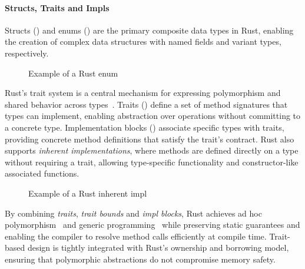 \paragraph{Structs, Traits and Impls}
Structs () and enums () are the primary composite data types in Rust, enabling the creation of complex data structures with named fields and variant types, respectively.
\begin{figure}[htb!]
	\centering
	\begin{minipage}{0.49\textwidth}
		\centering
		\captionsetup{type=listing,skip=2pt}
		\caption{Example of a Rust struct}
	\end{minipage}
	\hfill
	\begin{minipage}{0.49\textwidth}
		\centering
		\captionsetup{type=listing,skip=2pt}
		\caption{Example of a Rust enum}
	\end{minipage}
	\label{fig:structs-enums}
\end{figure}

Rust's trait system is a central mechanism for expressing polymorphism and shared behavior across types~\cite{RustBook,Matsakis14}.
Traits () define a set of method signatures that types can implement, enabling abstraction over operations without committing to a concrete type.
Implementation blocks () associate specific types with traits, providing concrete method definitions that satisfy the trait's contract.
Rust also supports \textit{inherent implementations}, where methods are defined directly on a type without requiring a trait, allowing type-specific functionality and constructor-like associated functions.
\begin{figure}[htb!]
	\centering
	\begin{minipage}{0.49\textwidth}
		\centering
		\captionsetup{type=listing,skip=2pt}
		\caption{Example of a Rust trait impl}
	\end{minipage}
	\hfill
	\begin{minipage}{0.49\textwidth}
		\centering
		\captionsetup{type=listing,skip=2pt}
		\caption{Example of a Rust inherent impl}
	\end{minipage}
	\label{fig:traits-impls}
\end{figure}

By combining \textit{traits}, \textit{trait bounds} and \textit{impl blocks}, Rust achieves ad hoc polymorphism~\cite{Cardelli85,Wadler90} and generic programming~\cite{Musser89,Backhouse99} while preserving static guarantees and enabling the compiler to resolve method calls efficiently at compile time.
Trait-based design is tightly integrated with Rust's ownership and borrowing model, ensuring that polymorphic abstractions do not compromise memory safety.

